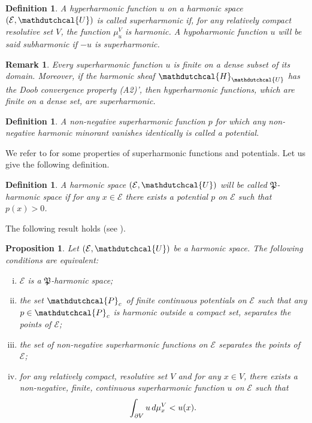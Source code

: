 \documentclass{amsart}
\newtheorem{prop}[thm]{Proposition}
\newtheorem{defn}[thm]{Definition}
\newtheorem{rem}[thm]{Remark}
\numberwithin{equation}{section}
\def \Hd{{\mathdutchcal{H}}}
\def \Ec{{\mathcal{E}}}
\def \Ud{{\mathdutchcal{U}}}
\begin{document}
{\begin{defn}
A hyperharmonic function $u$ on a harmonic space $(\Ec,\Ud)$ is called \textup{superharmonic} if, for any relatively compact resolutive set $V$, the function $\mu^V_u$ is harmonic. A hypoharmonic function $u$ will be said \textup{subharmonic} if $-u$ is superharmonic.
\end{defn}
\begin{rem}\label{sup finite on a dense set}{\rm
Every superharmonic function $u$ is finite on a dense subset of its domain. Moreover, if the harmonic sheaf $\Hd_{\Ud}$ has the Doob convergence property \textup{{\rm (A2)'}}, then hyperharmonic functions, which are finite on a dense set, are superharmonic.
}
\end{rem}

\begin{defn}
 A non-negative superharmonic function $p$ for which any non-negative harmonic minorant vanishes identically is called a \textup{potential}.
\end{defn}
We refer to \cite{CC72} for some properties of superharmonic functions and potentials.  Let us give the following definition.

\begin{defn}\label{beta armonico} A harmonic space $(\Ec,\Ud)$ will be called $\mathfrak{P}$-\textup{harmonic space} if for any $x \in \Ec$ there exists a potential $p$ on $\Ec$ such that $p(x)>0$.
\end{defn}
The following result holds (see \cite[Proposition 2.3.2 ]{CC72}).
\begin{prop}
\label{thm 1}
Let $(\Ec,\Ud)$ be a harmonic space. The following conditions are equivalent:
\begin{enumerate}[(i)]
\item $\Ec$ is a $\mathfrak{P}$-harmonic space;
\item the set $\mathdutchcal{P}_c$ of finite continuous potentials on $\Ec$ such that any $p\in \mathdutchcal{P}_c$ is harmonic outside a compact set, separates the points of $\Ec$;
\item the set of non-negative superharmonic functions on $\Ec$ separates the points of $\Ec$;
\item for any relatively compact, resolutive set $V$ and for any $x \in V$, there exists a non-negative, finite, continuous superharmonic function $u$ on $\Ec$ such that 
$$
\int_{\partial V} u \, {\rm d}\mu^V_x < u(x).
$$
\end{enumerate}
\end{prop}

}
\end{document}
